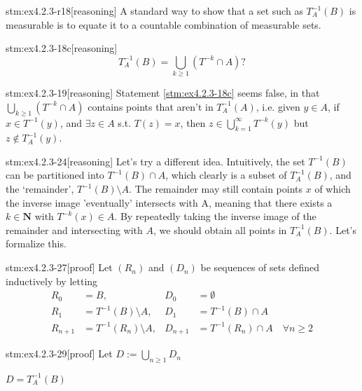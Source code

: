 \begin{stm}{stm:ex4.2.3-r18}[reasoning]
A standard way to show that a set such as $T_A^{-1}(B)$ is measurable is to equate it to a countable combination of measurable sets.
\end{stm}

\begin{stm}{stm:ex4.2.3-18c}[reasoning]
\[
T_A^{-1}(B) = \bigcup_{k \geq 1} (T^{-k} \cap A)?
\]
\end{stm}

\begin{stm}{stm:ex4.2.3-19}[reasoning]
Statement \ref{stm:ex4.2.3-18c} seems false, in that $\bigcup_{k \geq 1}(T^{-k} \cap A)$ contains points that aren't in $T_A^{-1}(A)$, i.e. given $y \in A$, if $x \in T^{-1}(y)$, and $\exists z \in A$ s.t. $T(z) = x$, then $z \in \bigcup_{k=1}^{\infty} T^{-k}(y)$ but $z \notin T_A^{-1}(y)$.
\end{stm}

\begin{stm}{stm:ex4.2.3-24}[reasoning]
Let's try a different idea. Intuitively, the set $T^{-1}(B)$ can be partitioned into $T^{-1}(B) \cap A$, which clearly is a subset of $T_A^{-1}(B)$, and the ‘remainder’, $T^{-1}(B) \setminus A$. The remainder may still contain points $x$ of which the inverse image 'eventually' intersects with A, meaning that there exists a $k \in \mathbf{N}$ with $T^{-k}(x) \in A$.  By repeatedly taking the inverse image of the remainder and intersecting with $A$, we should obtain all points in $T_A^{-1}(B)$. Let's formalize this.
\end{stm}

\begin{stm}{stm:ex4.2.3-27}[proof]
Let $(R_n)$ and $(D_n)$ be sequences of sets defined inductively by letting
\begin{align*}
R_0 &= B, & D_0 &= \emptyset \\
R_1 &= T^{-1}(B) \setminus A, & D_1 &= T^{-1}(B) \cap A \\
R_{n+1} &= T^{-1}(R_n) \setminus A, & D_{n+1} &= T^{-1}(R_n) \cap A \quad \forall n \ge 2
\end{align*}
\end{stm}

\begin{stm}{stm:ex4.2.3-29}[proof]
Let $D := \bigcup_{n \ge 1} D_n$
\end{stm}

\begin{conj}\label{conj:28}
$D = T_A^{-1}(B)$
\end{conj}

